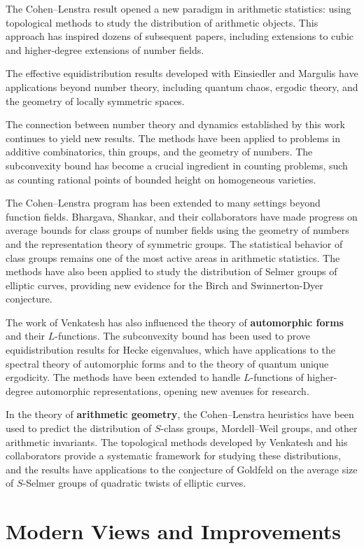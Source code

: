 The Cohen--Lenstra result opened a new paradigm in arithmetic statistics: using topological methods to study the distribution of arithmetic objects. This approach has inspired dozens of subsequent papers, including extensions to cubic and higher-degree extensions of number fields.

The effective equidistribution results developed with Einsiedler and Margulis have applications beyond number theory, including quantum chaos, ergodic theory, and the geometry of locally symmetric spaces.

The connection between number theory and dynamics established by this work continues to yield new results. The methods have been applied to problems in additive combinatorics, thin groups, and the geometry of numbers. The subconvexity bound has become a crucial ingredient in counting problems, such as counting rational points of bounded height on homogeneous varieties.

The Cohen--Lenstra program has been extended to many settings beyond function fields. Bhargava, Shankar, and their collaborators have made progress on average bounds for class groups of number fields using the geometry of numbers and the representation theory of symmetric groups. The statistical behavior of class groups remains one of the most active areas in arithmetic statistics. The methods have also been applied to study the distribution of Selmer groups of elliptic curves, providing new evidence for the Birch and Swinnerton-Dyer conjecture.

The work of Venkatesh has also influenced the theory of \textbf{automorphic forms} and their $L$-functions. The subconvexity bound has been used to prove equidistribution results for Hecke eigenvalues, which have applications to the spectral theory of automorphic forms and to the theory of quantum unique ergodicity. The methods have been extended to handle $L$-functions of higher-degree automorphic representations, opening new avenues for research.

In the theory of \textbf{arithmetic geometry}, the Cohen--Lenstra heuristics have been used to predict the distribution of $S$-class groups, Mordell--Weil groups, and other arithmetic invariants. The topological methods developed by Venkatesh and his collaborators provide a systematic framework for studying these distributions, and the results have applications to the conjecture of Goldfeld on the average size of $S$-Selmer groups of quadratic twists of elliptic curves.

\section{Modern Views and Improvements}

